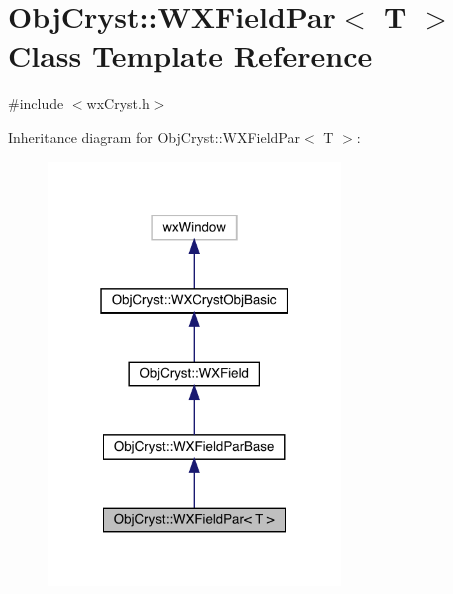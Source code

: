 \hypertarget{class_obj_cryst_1_1_w_x_field_par}{}\section{Obj\+Cryst\+::W\+X\+Field\+Par$<$ T $>$ Class Template Reference}
\label{class_obj_cryst_1_1_w_x_field_par}


{\ttfamily \#include $<$wx\+Cryst.\+h$>$}



Inheritance diagram for Obj\+Cryst\+::W\+X\+Field\+Par$<$ T $>$\+:
\nopagebreak
\begin{figure}[H]
\begin{center}
\leavevmode
\includegraphics[width=220pt]{class_obj_cryst_1_1_w_x_field_par__inherit__graph}
\end{center}
\end{figure}


